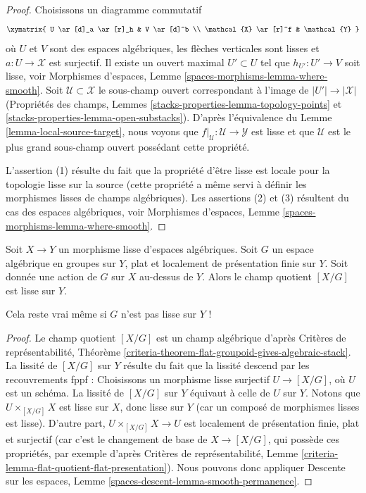 \begin{proof}
Choisissons un diagramme commutatif
$$
\xymatrix{
U \ar[d]_a \ar[r]_h & V \ar[d]^b \\
\mathcal{X} \ar[r]^f & \mathcal{Y}
}
$$
où $U$ et $V$ sont des espaces algébriques, les flèches verticales sont lisses
et $a : U \to \mathcal{X}$ est surjectif. Il existe un ouvert maximal
$U' \subset U$ tel que $h_{U'} : U' \to V$ soit lisse, voir
Morphismes d'espaces, Lemme \ref{spaces-morphisms-lemma-where-smooth}.
Soit $\mathcal{U} \subset \mathcal{X}$ le sous-champ ouvert
correspondant à l'image de $|U'| \to |\mathcal{X}|$
(Propriétés des champs, Lemmes \ref{stacks-properties-lemma-topology-points} et
\ref{stacks-properties-lemma-open-substacks}).
D'après l'équivalence du Lemme \ref{lemma-local-source-target},
nous voyons que $f|_\mathcal{U} : \mathcal{U} \to \mathcal{Y}$ est lisse
et que $\mathcal{U}$ est le plus grand sous-champ ouvert possédant cette
propriété.

\medskip\noindent
L'assertion (1) résulte du fait que la propriété d'être lisse
est locale pour la topologie lisse sur la source (cette propriété a même servi à définir les
morphismes lisses de champs algébriques).
Les assertions (2) et (3) résultent du cas des espaces algébriques, voir
Morphismes d'espaces, Lemme \ref{spaces-morphisms-lemma-where-smooth}.
\end{proof}

\begin{lemma}
\label{lemma-smooth-quotient-stack}
Soit $X \to Y$ un morphisme lisse d'espaces algébriques.
Soit $G$ un espace algébrique en groupes sur $Y$, plat
et localement de présentation finie sur $Y$. Soit donnée une action de $G$ sur $X$ au-dessus de $Y$.
Alors le champ quotient $[X/G]$ est lisse sur $Y$.
\end{lemma}

\noindent
Cela reste vrai même si $G$ n'est pas lisse sur $Y$ !

\begin{proof}
Le champ quotient $[X/G]$ est un champ algébrique d'après
Critères de représentabilité, Théorème
\ref{criteria-theorem-flat-groupoid-gives-algebraic-stack}.
La lissité de $[X/G]$ sur $Y$ résulte du fait que la lissité
descend par les recouvrements fppf :
Choisissons un morphisme lisse surjectif $U \to [X/G]$, où $U$ est un schéma.
La lissité de $[X/G]$ sur $Y$ équivaut à celle de $U$ sur $Y$.
Notons que $U \times_{[X/G]} X$ est lisse sur $X$, donc lisse
sur $Y$ (car un composé de morphismes lisses est lisse).
D'autre part, $U \times_{[X/G]} X \to U$ est localement de
présentation finie, plat et surjectif (car c'est
le changement de base de $X \to [X/G]$, qui possède ces propriétés,
par exemple d'après Critères de représentabilité, Lemme
\ref{criteria-lemma-flat-quotient-flat-presentation}).
Nous pouvons donc appliquer Descente sur les espaces,
Lemme \ref{spaces-descent-lemma-smooth-permanence}.
\end{proof}

